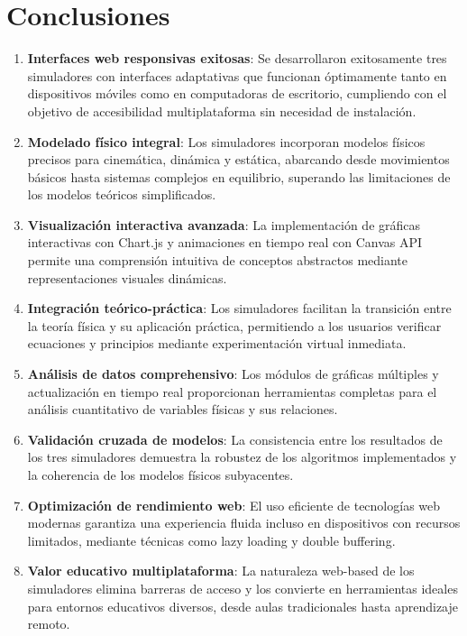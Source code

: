 \section{Conclusiones}

\begin{enumerate}
    \item \textbf{Interfaces web responsivas exitosas}: Se desarrollaron exitosamente tres simuladores con interfaces adaptativas que funcionan óptimamente tanto en dispositivos móviles como en computadoras de escritorio, cumpliendo con el objetivo de accesibilidad multiplataforma sin necesidad de instalación.
    
    \item \textbf{Modelado físico integral}: Los simuladores incorporan modelos físicos precisos para cinemática, dinámica y estática, abarcando desde movimientos básicos hasta sistemas complejos en equilibrio, superando las limitaciones de los modelos teóricos simplificados.
    
    \item \textbf{Visualización interactiva avanzada}: La implementación de gráficas interactivas con Chart.js y animaciones en tiempo real con Canvas API permite una comprensión intuitiva de conceptos abstractos mediante representaciones visuales dinámicas.
    
    \item \textbf{Integración teórico-práctica}: Los simuladores facilitan la transición entre la teoría física y su aplicación práctica, permitiendo a los usuarios verificar ecuaciones y principios mediante experimentación virtual inmediata.
    
    \item \textbf{Análisis de datos comprehensivo}: Los módulos de gráficas múltiples y actualización en tiempo real proporcionan herramientas completas para el análisis cuantitativo de variables físicas y sus relaciones.
    
    \item \textbf{Validación cruzada de modelos}: La consistencia entre los resultados de los tres simuladores demuestra la robustez de los algoritmos implementados y la coherencia de los modelos físicos subyacentes.
    
    \item \textbf{Optimización de rendimiento web}: El uso eficiente de tecnologías web modernas garantiza una experiencia fluida incluso en dispositivos con recursos limitados, mediante técnicas como lazy loading y double buffering.
    
    \item \textbf{Valor educativo multiplataforma}: La naturaleza web-based de los simuladores elimina barreras de acceso y los convierte en herramientas ideales para entornos educativos diversos, desde aulas tradicionales hasta aprendizaje remoto.
\end{enumerate}

